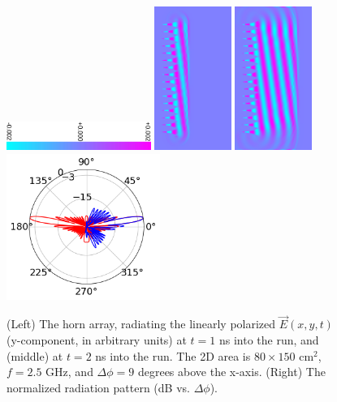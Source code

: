 \documentclass[11pt]{amsart}
\begin{document}
\begin{figure}
\centering
\includegraphics[width=4.7cm,angle=90]{figures/fields/colorbar.pdf}
\includegraphics[width=2.5cm]{figures/fields/ey_phase_horn_t30.png}
\includegraphics[width=2.5cm]{figures/fields/ey_phase_horn_t60.png}
\includegraphics[width=5cm]{figures/fields/rad_patt_field.png}
\caption{\label{fig:1dhornresults2} (Left) The horn array, radiating the linearly polarized $\vec{E}(x,y,t)$ (y-component, in arbitrary units) at $t = 1$ ns into the run, and (middle) at $t = 2$ ns into the run.  The 2D area is $80 \times 150$ cm$^2$, $f=2.5$ GHz, and $\Delta \phi = 9$ degrees above the x-axis. (Right) The normalized radiation pattern (dB vs. $\Delta \phi$).}
\end{figure}
\end{document}
